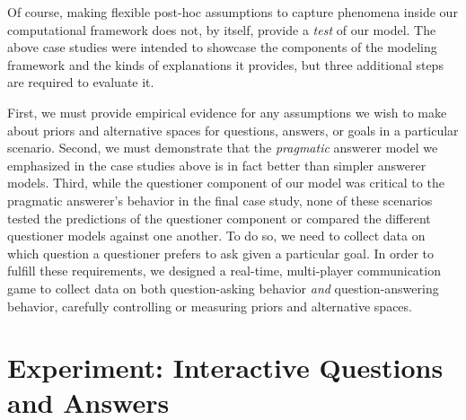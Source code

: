 \documentclass[12pt, floatsintext, jou]{apa6}
\begin{document}

Of course, making flexible post-hoc assumptions to capture phenomena inside our computational framework does not, by itself, provide a \emph{test} of our model. The above case studies were intended to showcase the components of the modeling framework and the kinds of explanations it provides, but three additional steps are required to evaluate it. 

First, we must provide empirical evidence for any assumptions we wish to make about priors and alternative spaces for questions, answers, or goals in a particular scenario. Second, we must demonstrate that the \emph{pragmatic} answerer model we emphasized in the case studies above is in fact better than simpler answerer models. Third, while the questioner component of our model was critical to the pragmatic answerer's behavior in the final case study, none of these scenarios tested the predictions of the questioner component or compared the different questioner models against one another. To do so, we need to collect data on which question a questioner prefers to ask given a particular goal. 
In order to fulfill these requirements, we designed a real-time, multi-player communication game to collect data on both question-asking behavior \emph{and} question-answering behavior, carefully controlling or measuring priors and alternative spaces.

\section{Experiment: Interactive Questions and Answers}
\end{document}
